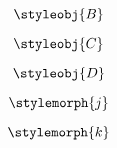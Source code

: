 {\begin{forslides}
        \begin{equation}
            \label{eq:48}
            \styleobj{B}
        \end{equation}
        
        \begin{equation}
            \label{eq:49}
            \styleobj{C}
        \end{equation}
        
        \begin{equation}
            \label{eq:50}
            \styleobj{D}
        \end{equation}
        
        \begin{equation}
            \label{eq:51}
            \stylemorph{j}
        \end{equation}
        
        \begin{equation}
            \label{eq:52}
            \stylemorph{k}
        \end{equation}
    
    \end{forslides}
}


